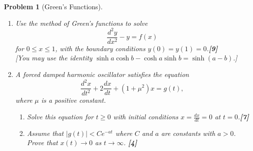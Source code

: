 \documentclass[a4paper]{article}
\theoremstyle{new}
\newtheorem{qns}{Problem}[section]
\begin{document}
\begin{qns}[Green's Functions]\leavevmode
\begin{enumerate}[label=(\alph*)]
    \item Use the method of Green’s functions to solve
$$\frac{d^2y}{dx^2}-y=f(x)$$
for $0\leq x\leq 1$, with the boundary conditions $y(0) = y(1) = 0$.\hfill \textbf{[9]}\\[5pt]
[You may use the identity $\sinh a \cosh b − \cosh a \sinh b = \sinh(a − b)$.]
\item A forced damped harmonic oscillator satisfies the equation
$$\frac{d^2x}{dt^2}+2\frac{dx}{dt}+(1+\mu^2)x=g(t),$$
where $\mu$ is a positive constant.
\begin{enumerate}[label=(\roman*)]
    \item Solve this equation for $t\geq0$ with initial conditions $x=\frac{dx}{dt}=0$ at $t=0$.\hfill \textbf{[7]}
    \item Assume that $|g(t)|<Ce^{-at}$ where $C$ and $a$ are constants with $a > 0$. Prove that $x(t)\rightarrow0$ as $t\rightarrow\infty$. \hfill \textbf{[4]}
\end{enumerate}
\end{enumerate}
\end{qns}
\end{document}
